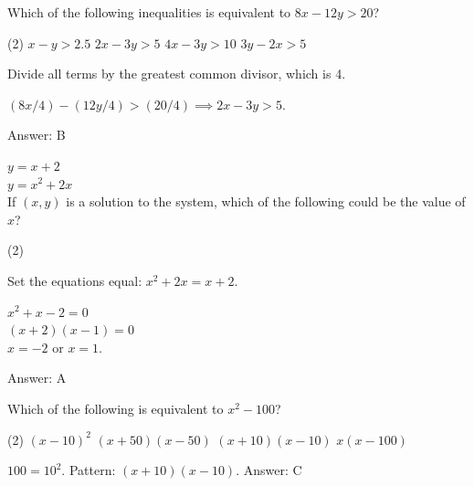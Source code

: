 \documentclass[11pt,paper=a4,answers]{exam}
\begin{document}
\begin{questions}
\vspace{1cm}
\question
Which of the following inequalities is equivalent to $8x - 12y > 20$?
\begin{tasks}(2)
    \task $x - y > 2.5$
    \task $2x - 3y > 5$
    \task $4x - 3y > 10$
    \task $3y - 2x > 5$
\end{tasks}

\begin{solution}
Divide all terms by the greatest common divisor, which is 4.
\vspace{5pt}
\begin{center}
$(8x/4) - (12y/4) > (20/4) \implies 2x - 3y > 5$.
\end{center}
\vspace{5pt}
Answer: \colorbox{yellow!100}{B}
\end{solution}

\vspace{1cm}

\question
$y = x + 2$ \\
$y = x^2 + 2x$ \\
If $(x, y)$ is a solution to the system, which of the following could be the value of $x$?
\begin{tasks}(2)
       
\end{tasks}

\begin{solution}
Set the equations equal: $x^2 + 2x = x + 2$.
\vspace{5pt}
\begin{center}
$x^2 + x - 2 = 0$ \\
$(x+2)(x-1) = 0$ \\
$x = -2$ or $x = 1$.
\end{center}
\vspace{5pt}
Answer: \colorbox{yellow!100}{A}
\end{solution}

\vspace{1cm}

\question
Which of the following is equivalent to $x^2 - 100$?
\begin{tasks}(2)
    \task $(x-10)^2$ \task $(x+50)(x-50)$ \task $(x+10)(x-10)$ \task $x(x-100)$
\end{tasks}

\begin{solution}
$100 = 10^2$. Pattern: $(x+10)(x-10)$.
\vspace{5pt}
Answer: \colorbox{yellow!100}{C}
\end{solution}


\end{questions}
\end{document}
